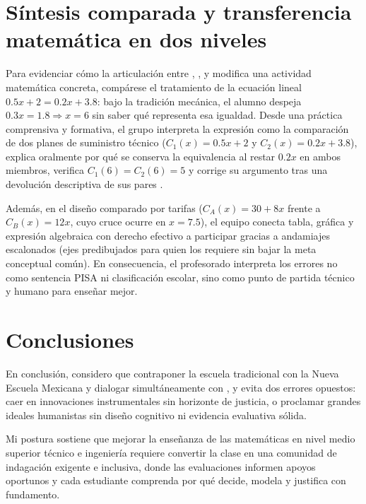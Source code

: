 \documentclass[spanish,letterpaper,oneside]{article}
\begin{document}
\section{Síntesis comparada y transferencia matemática en dos niveles}
Para evidenciar cómo la articulación entre \citet{scallon2004evaluation}, \citet{meirieu2020escuela}, \citet{sawyer2008optimizing} y \citet{martinezRizo2026pisa} modifica una actividad matemática concreta, compárese el tratamiento de la ecuación lineal $0.5x + 2 = 0.2x + 3.8$: bajo la tradición mecánica, el alumno despeja $0.3x = 1.8 \Rightarrow x = 6$ sin saber qué representa esa igualdad. Desde una práctica comprensiva y formativa, el grupo interpreta la expresión como la comparación de dos planes de suministro técnico ($C_1(x)=0.5x+2$ y $C_2(x)=0.2x+3.8$), explica oralmente por qué se conserva la equivalencia al restar $0.2x$ en ambos miembros, verifica $C_1(6)=C_2(6)=5$ y corrige su argumento tras una devolución descriptiva de sus pares \citep{star2015algebra,eef2021feedback}.

Además, en el diseño comparado por tarifas ($C_A(x) = 30 + 8x$ frente a $C_B(x) = 12x$, cuyo cruce ocurre en $x = 7.5$), el equipo conecta tabla, gráfica y expresión algebraica con derecho efectivo a participar gracias a andamiajes escalonados (ejes predibujados para quien los requiere sin bajar la meta conceptual común). En consecuencia, el profesorado interpreta los errores no como sentencia PISA ni clasificación escolar, sino como punto de partida técnico y humano para enseñar mejor.

\clearpage
\section{Conclusiones}
En conclusión, considero que contraponer la escuela tradicional con la Nueva Escuela Mexicana y dialogar simultáneamente con \citet{meirieu2020escuela}, \citet{sawyer2008optimizing} y \citet{martinezRizo2026pisa} evita dos errores opuestos: caer en innovaciones instrumentales sin horizonte de justicia, o proclamar grandes ideales humanistas sin diseño cognitivo ni evidencia evaluativa sólida.

Mi postura sostiene que mejorar la enseñanza de las matemáticas en nivel medio superior técnico e ingeniería requiere convertir la clase en una comunidad de indagación exigente e inclusiva, donde las evaluaciones informen apoyos oportunos y cada estudiante comprenda por qué decide, modela y justifica con fundamento.
\end{document}
